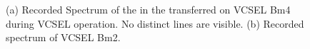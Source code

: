 \begin{figure}[tp]
\begin{subfigure}[t]{ 0.49\linewidth}
			\caption{}
			\label{subfig::spectrum_vcsel_excitation_without_diamond}
		\end{subfigure}
		\caption{(a) Recorded Spectrum of the \siv in the transferred \nd on VCSEL Bm4 during VCSEL operation. No distinct \siv lines are visible. (b) Recorded spectrum of VCSEL Bm2.}
		\label{fig::vcsel_spectra}
	\end{figure}


